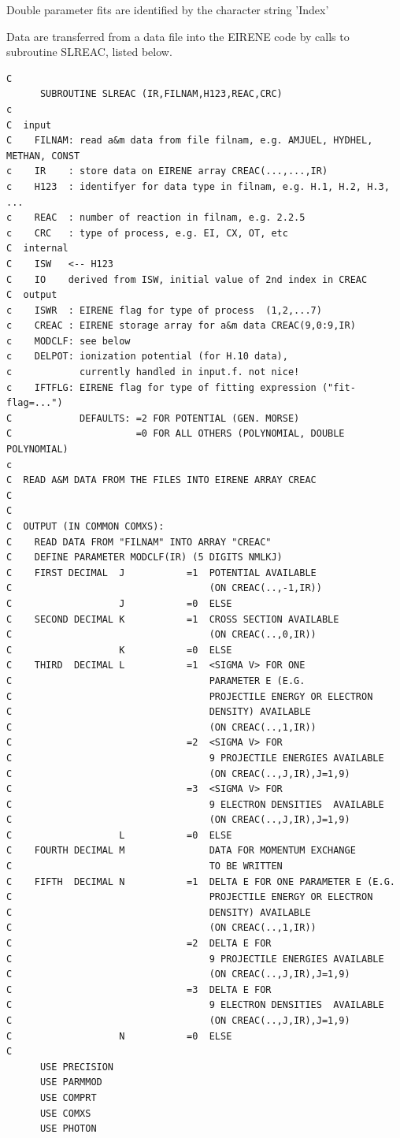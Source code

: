\documentclass[12pt,dvips]{article}
\begin{document}
Double parameter fits are identified by the character string
'Index'


Data are transferred from a data file into the EIRENE code by
calls to subroutine SLREAC, listed below.

\begin{small}\begin{verbatim}
C
      SUBROUTINE SLREAC (IR,FILNAM,H123,REAC,CRC)
c
C  input
C    FILNAM: read a&m data from file filnam, e.g. AMJUEL, HYDHEL, METHAN, CONST
c    IR    : store data on EIRENE array CREAC(...,...,IR)
c    H123  : identifyer for data type in filnam, e.g. H.1, H.2, H.3, ...
c    REAC  : number of reaction in filnam, e.g. 2.2.5
c    CRC   : type of process, e.g. EI, CX, OT, etc
C  internal
C    ISW   <-- H123
C    IO    derived from ISW, initial value of 2nd index in CREAC
C  output
c    ISWR  : EIRENE flag for type of process  (1,2,...7)
c    CREAC : EIRENE storage array for a&m data CREAC(9,0:9,IR)
c    MODCLF: see below
c    DELPOT: ionization potential (for H.10 data),
c            currently handled in input.f. not nice!
c    IFTFLG: EIRENE flag for type of fitting expression ("fit-flag=...")
C            DEFAULTS: =2 FOR POTENTIAL (GEN. MORSE)
C                      =0 FOR ALL OTHERS (POLYNOMIAL, DOUBLE POLYNOMIAL)
c
C  READ A&M DATA FROM THE FILES INTO EIRENE ARRAY CREAC
C
C
C  OUTPUT (IN COMMON COMXS):
C    READ DATA FROM "FILNAM" INTO ARRAY "CREAC"
C    DEFINE PARAMETER MODCLF(IR) (5 DIGITS NMLKJ)
C    FIRST DECIMAL  J           =1  POTENTIAL AVAILABLE
C                                   (ON CREAC(..,-1,IR))
C                   J           =0  ELSE
C    SECOND DECIMAL K           =1  CROSS SECTION AVAILABLE
C                                   (ON CREAC(..,0,IR))
C                   K           =0  ELSE
C    THIRD  DECIMAL L           =1  <SIGMA V> FOR ONE
C                                   PARAMETER E (E.G.
C                                   PROJECTILE ENERGY OR ELECTRON
C                                   DENSITY) AVAILABLE
C                                   (ON CREAC(..,1,IR))
C                               =2  <SIGMA V> FOR
C                                   9 PROJECTILE ENERGIES AVAILABLE
C                                   (ON CREAC(..,J,IR),J=1,9)
C                               =3  <SIGMA V> FOR
C                                   9 ELECTRON DENSITIES  AVAILABLE
C                                   (ON CREAC(..,J,IR),J=1,9)
C                   L           =0  ELSE
C    FOURTH DECIMAL M               DATA FOR MOMENTUM EXCHANGE
C                                   TO BE WRITTEN
C    FIFTH  DECIMAL N           =1  DELTA E FOR ONE PARAMETER E (E.G.
C                                   PROJECTILE ENERGY OR ELECTRON
C                                   DENSITY) AVAILABLE
C                                   (ON CREAC(..,1,IR))
C                               =2  DELTA E FOR
C                                   9 PROJECTILE ENERGIES AVAILABLE
C                                   (ON CREAC(..,J,IR),J=1,9)
C                               =3  DELTA E FOR
C                                   9 ELECTRON DENSITIES  AVAILABLE
C                                   (ON CREAC(..,J,IR),J=1,9)
C                   N           =0  ELSE
C
      USE PRECISION
      USE PARMMOD
      USE COMPRT
      USE COMXS
      USE PHOTON


\end{verbatim}
\end{small}
\end{document}
